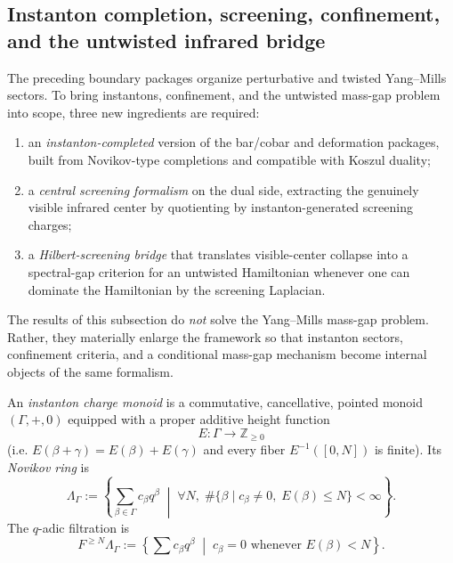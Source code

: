 
\subsection{Instanton completion, screening, confinement, and the untwisted infrared bridge}
\label{subsec:instanton-screening-ir-bridge}

\begin{summary}
The preceding boundary packages organize perturbative and twisted Yang--Mills sectors.
To bring instantons, confinement, and the untwisted mass-gap problem into scope, three
new ingredients are required:
\begin{enumerate}[label=(\roman*)]
\item an \emph{instanton-completed} version of the bar/cobar and deformation packages, built from
Novikov-type completions and compatible with Koszul duality;
\item a \emph{central screening formalism} on the dual side, extracting the genuinely visible
infrared center by quotienting by instanton-generated screening charges;
\item a \emph{Hilbert-screening bridge} that translates visible-center collapse into a spectral-gap
criterion for an untwisted Hamiltonian whenever one can dominate the Hamiltonian by the screening
Laplacian.
\end{enumerate}
The results of this subsection do \emph{not} solve the Yang--Mills mass-gap problem.  Rather, they
materially enlarge the framework so that instanton sectors, confinement criteria, and a conditional
mass-gap mechanism become internal objects of the same formalism.
\end{summary}

\begin{definition}
\label{def:instanton-charge-monoid}
An \emph{instanton charge monoid} is a commutative, cancellative, pointed monoid
$(\Gamma,+,0)$ equipped with a proper additive height function
\[
E\colon \Gamma \longrightarrow \mathbb Z_{\ge 0}
\]
(i.e. $E(\beta+\gamma)=E(\beta)+E(\gamma)$ and every fiber $E^{-1}([0,N])$ is finite).
Its \emph{Novikov ring} is
\[
\Lambda_{\Gamma}
:=
\left\{\sum_{\beta\in\Gamma} c_{\beta} q^{\beta}
\;\middle|\;
\forall N,\; \#\{\beta\mid c_{\beta}\neq 0,\;E(\beta)\le N\}<\infty
\right\}.
\]
The $q$-adic filtration is
\[
F^{\ge N}\Lambda_{\Gamma}
:=
\left\{\sum c_{\beta}q^{\beta}\;\middle|\; c_{\beta}=0\text{ whenever }E(\beta)<N\right\}.
\]
\end{definition}

